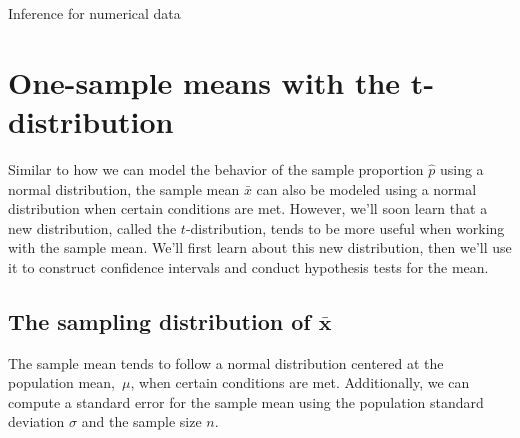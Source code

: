 \begin{chapterpage}{Inference for numerical data}
  \label{inferenceForNumericalData}
  \label{ch_inference_for_means}
\end{chapterpage}
\renewcommand{\chapterfolder}{ch_inference_for_means}





\section[One-sample means with the $t$-distribution]{One-sample means with the $\mathbf{t}$-distribution}
\label{oneSampleMeansWithTDistribution}

\noindent%
Similar to how we can model the behavior of the
sample proportion $\hat{p}$ using a normal distribution,
the sample mean $\bar{x}$ can also be modeled using
a normal distribution when certain conditions are met.
However, we'll soon learn that a new distribution,
called the $t$-distribution,
tends to be more useful when working with the sample mean.
We'll first learn about this new distribution,
then we'll use it to construct confidence intervals
and conduct hypothesis tests for the mean.


\subsection[The distribution of $\bar{x}$]
    {The sampling distribution of $\pmb{\bar{x}}$}

The sample mean tends to follow
a normal distribution centered at the population mean,~$\mu$,
when certain conditions are met.
Additionally, we can compute a standard error for the sample
mean using the population standard deviation $\sigma$
and the sample size $n$.

